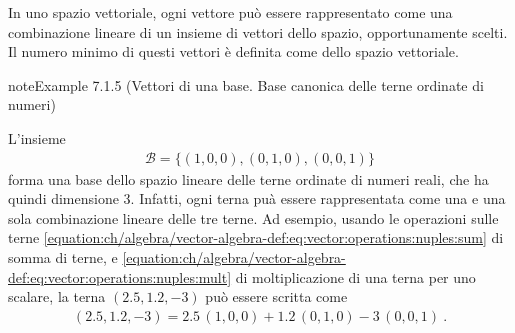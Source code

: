 \documentclass[letterpaper,10pt,italian]{jupyterBook}
\begin{document}
\sphinxAtStartPar
{} In uno spazio vettoriale, ogni vettore può essere rappresentato come una combinazione lineare di un insieme di vettori dello spazio, opportunamente scelti. Il numero minimo di questi vettori è definita come  dello spazio vettoriale.
\label{ch/algebra/vector-algebra-def:example-4}
\begin{sphinxadmonition}{note}{Example 7.1.5 (Vettori di una base. Base canonica delle terne ordinate di numeri)}



\sphinxAtStartPar
L’insieme
\begin{equation*}
\begin{split}\mathcal{B} = \{ (1,0,0), (0,1,0), (0,0,1) \}\end{split}
\end{equation*}
\sphinxAtStartPar
forma una base dello spazio lineare delle terne ordinate di numeri reali, che ha quindi dimensione 3. Infatti, ogni terna puà essere rappresentata come una e una sola combinazione lineare delle tre terne. Ad esempio, usando le operazioni sulle terne \eqref{equation:ch/algebra/vector-algebra-def:eq:vector:operations:nuples:sum} di somma di terne, e \eqref{equation:ch/algebra/vector-algebra-def:eq:vector:operations:nuples:mult} di moltiplicazione di una terna per uno scalare, la terna \((2.5, 1.2, -3)\) può essere scritta come
\begin{equation*}
\begin{split}(2.5, 1.2, -3) = 2.5 \, (1,0,0) + 1.2 \, (0,1,0) - 3 \, (0,0,1) \ .\end{split}
\end{equation*}\end{sphinxadmonition}
\label{ch/algebra/vector-algebra-def:example-5}
\end{document}
